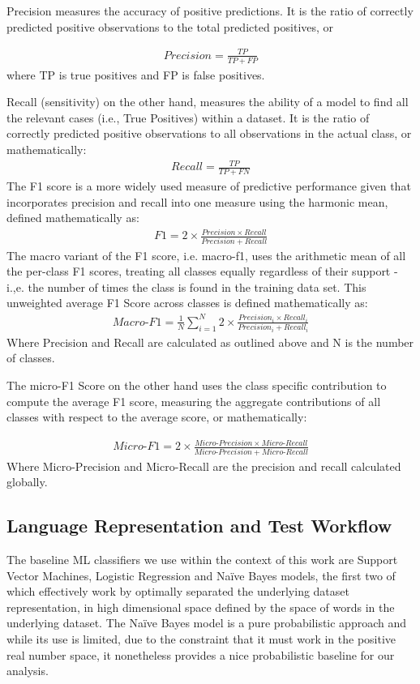 \documentclass[final]{clv2025}
\begin{document}
Precision measures the accuracy of positive predictions. It is the ratio of correctly predicted positive observations to the total predicted positives, or 

\begin{align*}
    Precision=\frac{TP}{TP+FP}
\end{align*}
where TP is true positives and FP is false positives. 

Recall (sensitivity) on the other hand, measures the ability of a model to find all the relevant cases (i.e., True Positives) within a dataset. It is the ratio of correctly predicted positive observations to all observations in the actual class, or mathematically:
\begin{align*}
    Recall=\frac{TP}{TP+FN}
\end{align*}
The F1 score is a more widely used measure of predictive performance given that incorporates precision and recall into one measure using the harmonic mean, defined mathematically as: 
\begin{align*}
  F1=2\times \frac{Precision\times Recall}{Precision+Recall}  
\end{align*}
The macro variant of the F1 score, i.e. macro-f1, uses the arithmetic mean of all the per-class F1 scores, treating all classes equally regardless of their support - i.,e. the number of times the class is found in the training data set. This unweighted average F1 Score across classes is defined mathematically as:
\begin{align*}
    Macro\text{-}F1=\frac{1}{N }\sum_{i=1}^{N} 2\times \frac{Precision_i\times Recall_i}{Precision_i+Recall_i} 
\end{align*}
Where Precision and Recall are calculated as outlined above and N is the number of classes.

The micro-F1 Score on the other hand uses the class specific contribution to compute the average F1 score, measuring the aggregate contributions of all classes with respect to the average score, or mathematically:

\begin{align*}
    Micro\text{-}F1=2\times \frac{Micro \text{-}Precision\times Micro\text{-}Recall}{Micro\text{-}Precision+Micro\text{-}Recall}
\end{align*}
Where Micro-Precision and Micro-Recall are the precision and recall calculated globally.
\subsection{	Language Representation and Test Workflow}
The baseline ML classifiers we use within the context of this work are Support Vector Machines, Logistic Regression and Naïve Bayes models, the first two of which effectively work by optimally separated the underlying dataset representation, in high dimensional space defined by the space of words in the underlying dataset. The Naïve Bayes model is a pure probabilistic approach and while its use is limited, due to the constraint that it must work in the positive real number space, it nonetheless provides a nice probabilistic baseline for our analysis. 
\end{document}
